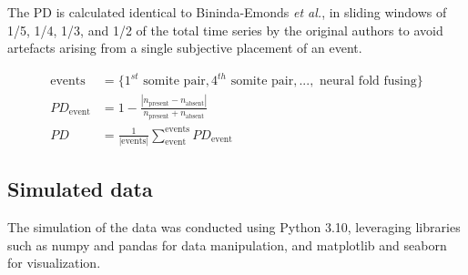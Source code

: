 The PD is calculated identical to Bininda-Emonds \textit{et al.},  in sliding windows of 1/5, 1/4, 1/3, and 1/2 of the total time series by the original authors to avoid artefacts arising from a single subjective placement of an event. 

\begin{align*}\label{eq:phenotypicdivergence}
    \text{events} &= \{1^{st}\text{ somite pair}, 4^{th}\text{ somite pair}, ...,\text{ neural fold fusing}\} \\ 
    PD_{\text{event}} &= 1 - \frac{|n_{\text{present}} - n_{\text{absent}}|}{n_{\text{present}} + n_{\text{absent}}} \\
    PD &= \frac{1}{|\text{events}|} \sum_{\text{event}}^{\text{events}} PD_{\text{event}}
\end{align*}

\subsection{Simulated data}

The simulation of the data was conducted using Python 3.10, leveraging libraries such as numpy and pandas for data manipulation, and matplotlib and seaborn for visualization.

